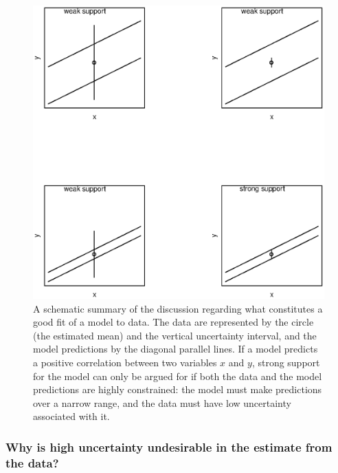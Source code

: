 \documentclass{cambridge7A}\usepackage[]{graphicx}\usepackage[]{color}
\makeatletter
\def\maxwidth{ %
  \ifdim\Gin@nat@width>\linewidth
    \linewidth
  \else
    \Gin@nat@width
  \fi
}
\newenvironment{knitrout}{}{} %
\makeatother
\begin{document}
\begin{figure}
\centering
\begin{knitrout}
\color{fgcolor}

{\centering \includegraphics[width=\maxwidth]{figures/fig-rp-1} 

}



\end{knitrout}
\caption{A schematic summary of the \cite{rp} discussion regarding what constitutes a good fit of a model to data. The data are represented by the circle (the estimated mean) and the vertical uncertainty interval, and the model predictions by the diagonal parallel lines. 
If a model predicts a positive correlation between two variables $x$ and $y$, strong support for the model can only be argued for if both the data and the model predictions are highly constrained: the model must make predictions over a narrow range, and the data must have low uncertainty associated with it.}\label{fig:rp}
\end{figure}


\subsubsection{Why is high uncertainty undesirable in the estimate from the data?} \label{typem}
\end{document}
